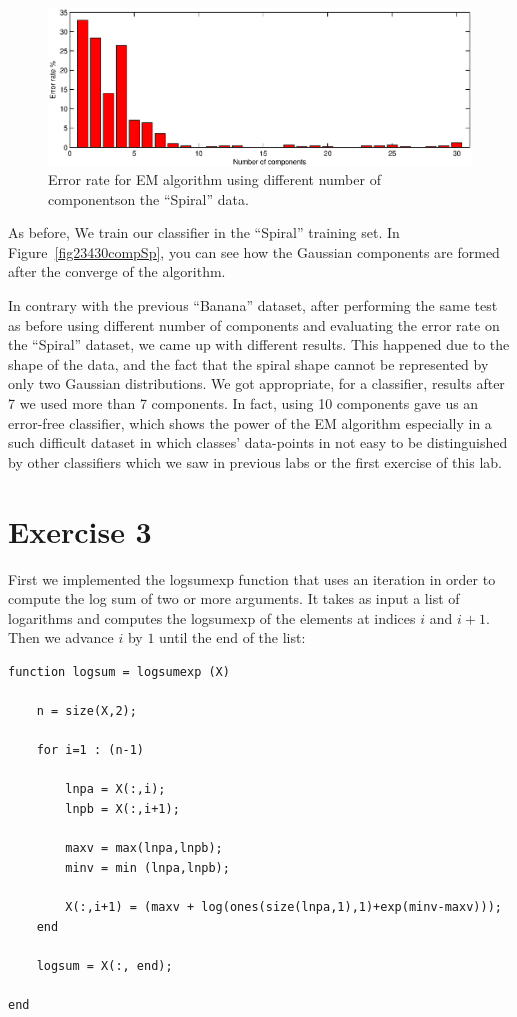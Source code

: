 \documentclass[a4paper,11pt]{article}
\begin{document}
~
\begin{figure}[h!]
  \centering   
      \includegraphics[width=1\textwidth]{figures/30compSp.eps}      
  \caption{Error rate for EM algorithm using different number of componentson the ``Spiral'' data.}
  \label{fig30comp}
\end{figure}


As before, We train our classifier in the ``Spiral'' training set. In Figure~\ref{fig23430compSp}, you can see how the Gaussian components are formed after the converge of the algorithm. 



In contrary with the previous ``Banana'' dataset, after performing the same test as before using different number of components and evaluating the error rate on the ``Spiral'' dataset, we came up with different results. This happened due to the shape of the data, and the fact that the spiral shape cannot be represented by only two Gaussian distributions. We got appropriate, for a classifier, results after 7 we used more than 7 components. In fact, using 10 components gave us an error-free classifier, which shows the power of the EM algorithm especially in a such difficult dataset in which classes' data-points in not easy to be distinguished by other classifiers which we saw in previous labs or the first exercise of this lab.


\section*{Exercise 3}
First we implemented the logsumexp function that uses an iteration in order to compute the log sum of two or more arguments. It takes as input a list of logarithms and computes the logsumexp of the elements at indices $i$ and $i+1$. Then we advance $i$ by $1$ until the end of the list:
\begin{verbatim}
function logsum = logsumexp (X)

    n = size(X,2);
    
    for i=1 : (n-1)
        
        lnpa = X(:,i);
        lnpb = X(:,i+1);
        
        maxv = max(lnpa,lnpb);
        minv = min (lnpa,lnpb);
        
        X(:,i+1) = (maxv + log(ones(size(lnpa,1),1)+exp(minv-maxv))); 
    end
    
    logsum = X(:, end);
    
end
\end{verbatim} 
\end{document}

